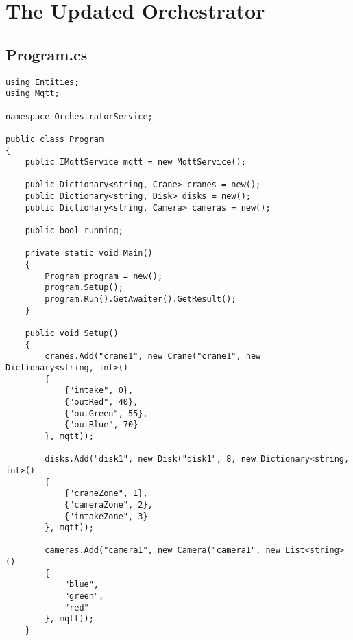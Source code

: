 \section{The Updated Orchestrator}\label{appendix:orchestrator-updated}

\subsection{Program.cs}\label{appendix:orchestrator-updated-programcs}

\begin{verbatim}
using Entities;
using Mqtt;

namespace OrchestratorService;

public class Program
{
    public IMqttService mqtt = new MqttService();
    
    public Dictionary<string, Crane> cranes = new();
    public Dictionary<string, Disk> disks = new();
    public Dictionary<string, Camera> cameras = new();
    
    public bool running;
    
    private static void Main()
    {
        Program program = new();
        program.Setup();
        program.Run().GetAwaiter().GetResult();
    }
    
    public void Setup()
    {
        cranes.Add("crane1", new Crane("crane1", new Dictionary<string, int>()
        {
            {"intake", 0},
            {"outRed", 40},
            {"outGreen", 55},
            {"outBlue", 70}
        }, mqtt));
    
        disks.Add("disk1", new Disk("disk1", 8, new Dictionary<string, int>()
        {
            {"craneZone", 1},
            {"cameraZone", 2},
            {"intakeZone", 3}
        }, mqtt));
    
        cameras.Add("camera1", new Camera("camera1", new List<string>()
        {
            "blue",
            "green",
            "red"
        }, mqtt));
    }
    

\end{verbatim}
